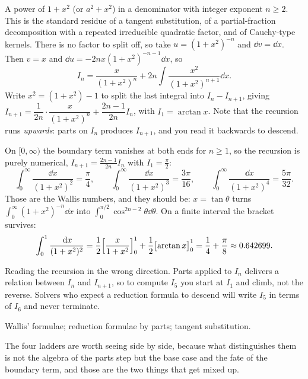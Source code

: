 \cue A power of $1+x^{2}$ (or $a^{2}+x^{2}$) in a denominator with integer exponent $n\geq2$. This is the standard residue of a tangent substitution, of a partial-fraction decomposition with a repeated irreducible quadratic factor, and of Cauchy-type kernels.
\method There is no factor to split off, so take $u=(1+x^{2})^{-n}$ and $\dd v=\dd x$. Then $v=x$ and $\dd u=-2nx(1+x^{2})^{-n-1}\dd x$, so
\[I_n=\frac{x}{(1+x^{2})^{n}}+2n\int\frac{x^{2}}{(1+x^{2})^{n+1}}\dd x.\]
Write $x^{2}=(1+x^{2})-1$ to split the last integral into $I_n-I_{n+1}$, giving $I_{n+1}=\dfrac{1}{2n}\cdot\dfrac{x}{(1+x^{2})^{n}}+\dfrac{2n-1}{2n}I_n$, with $I_1=\arctan x$. Note that the recursion runs \emph{upwards}: parts on $I_n$ produces $I_{n+1}$, and you read it backwards to descend.

\begin{worked}
On $[0,\infty)$ the boundary term vanishes at both ends for $n\geq1$, so the recursion is purely numerical, $I_{n+1}=\tfrac{2n-1}{2n}I_n$ with $I_1=\tfrac{\pi}{2}$:
\[\int_0^{\infty}\frac{\dd x}{(1+x^{2})^{2}}=\frac{\pi}{4},\qquad \int_0^{\infty}\frac{\dd x}{(1+x^{2})^{3}}=\frac{3\pi}{16},\qquad \int_0^{\infty}\frac{\dd x}{(1+x^{2})^{4}}=\frac{5\pi}{32}.\]
Those are the Wallis numbers, and they should be: $x=\tan\theta$ turns $\int_0^{\infty}(1+x^{2})^{-n}\dd x$ into $\int_0^{\pi/2}\cos^{2n-2}\theta\dd\theta$. On a finite interval the bracket survives:
\[\int_0^{1}\frac{\,\mathrm{d} x}{(1+x^{2})^{2}}=\frac12\Bigl[\frac{x}{1+x^{2}}\Bigr]_0^1+\frac12\bigl[\arctan x\bigr]_0^1=\frac14+\frac{\pi}{8}\approx0.642699.\]
\end{worked}

\begin{trap}
Reading the recursion in the wrong direction. Parts applied to $I_n$ delivers a relation between $I_n$ and $I_{n+1}$, so to compute $I_5$ you start at $I_1$ and climb, not the reverse. Solvers who expect a reduction formula to descend will write $I_5$ in terms of $I_6$ and never terminate.
\end{trap}

\begin{seealsob}Wallis' formulae; reduction formulae by parts; tangent substitution.\end{seealsob}

The four ladders are worth seeing side by side, because what distinguishes them is not the algebra of the parts step but the base case and the fate of the boundary term, and those are the two things that get mixed up.

